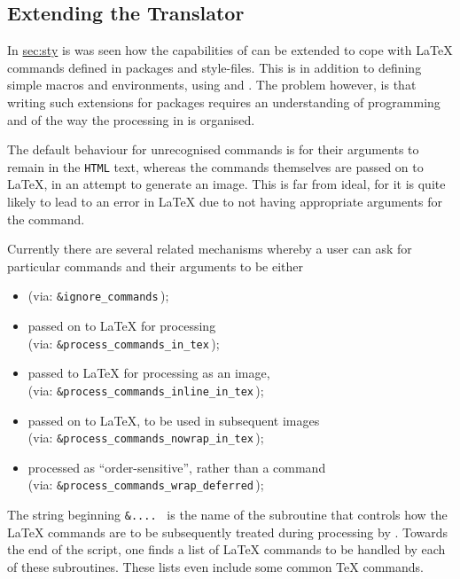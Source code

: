 \subsection{Extending the Translator\label{sec:ext}}%
\tableofchildlinks*\htmlrule
%
In \hyperref{an earlier section}{Section~}{}{sec:sty} is was seen how
the capabilities of \latextohtml{} can be extended to cope with
\LaTeX{} commands defined in packages and style-files.
This is in addition to defining simple macros and environments,
using  and .
The problem however, is that writing such extensions for packages 
requires an understanding of \Perl{} programming 
and of the way the processing in \latextohtml{} is organised. 

%
%
\smallskip

The default behaviour for unrecognised commands is 
for their arguments to remain in the \texttt{HTML} text,
whereas the commands themselves are passed on to \LaTeX,
in an attempt to generate an image. This is far from ideal,
for it is quite likely to lead to an error in \LaTeX{}
due to not having appropriate arguments for the command.

Currently there are several related mechanisms whereby a user 
can ask for particular commands and their arguments to be either 
\begin{itemize}
\item
{} (via: \texttt{\&ignore\_commands}\,);
\item
passed on to \LaTeX{}  for processing \\
(via: \texttt{\&process\_commands\_in\_tex}\,);
\item
passed to \LaTeX{}  for processing as an image, 
\\
(via: \texttt{\&process\_commands\_inline\_in\_tex}\,);
\item
passed on to \LaTeX,  
to be used in subsequent images\\
(via: \texttt{\&process\_commands\_nowrap\_in\_tex}\,);
\item
processed as ``order-sensitive'',  
rather than a command\\
(via: \texttt{\&process\_commands\_wrap\_deferred}\,);
\end{itemize}
The string beginning \texttt{\&.... } is the name of the \Perl{} subroutine 
that controls how the \LaTeX{} commands are to be subsequently treated during
processing by \latextohtml.
Towards the end of the  script, one finds a list
of \LaTeX{} commands to be handled by each of these subroutines.
These lists even include some common \TeX{} commands.

